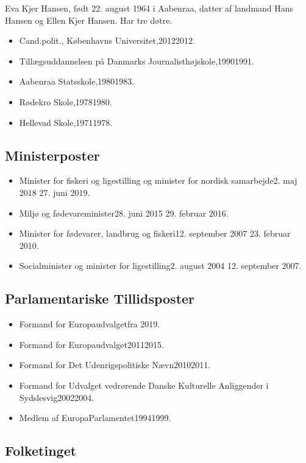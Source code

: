 \documentclass[11pt, a4paper]{awesome-cv}
\begin{document}
\makecvheader[R]
\makelettertitle
\begin{cvletter}
Eva Kjer Hansen, født 22. august 1964 i Aabenraa, datter af landmand Hans Hansen og Ellen Kjer Hansen. Har tre døtre.

\begin{itemize}
\item Cand.polit., Københavns Universitet,20122012.
\item Tillægsuddannelsen på Danmarks Journalisthøjskole,19901991.
\item Aabenraa Statsskole,19801983.
\item Rødekro Skole,19781980.
\item Hellevad Skole,19711978.
\end{itemize}
\subsection*{Ministerposter}
\begin{itemize}
\item Minister for fiskeri og ligestilling og minister for nordisk samarbejde2. maj 2018  27. juni 2019.
\item Miljø og fødevareminister28. juni 2015  29. februar 2016.
\item Minister for fødevarer, landbrug og fiskeri12. september 2007  23. februar 2010.
\item Socialminister og minister for ligestilling2. august 2004  12. september 2007.
\end{itemize}
\subsection*{Parlamentariske Tillidsposter}
\begin{itemize}
\item Formand for Europaudvalgetfra 2019.
\item Formand for Europaudvalget20112015.
\item Formand for Det Udenrigspolitiske Nævn20102011.
\item Formand for Udvalget vedrørende Danske Kulturelle Anliggender i Sydslesvig20022004.
\item Medlem af EuropaParlamentet19941999.
\end{itemize}
\subsection*{Folketinget}

\end{cvletter}
\end{document}
